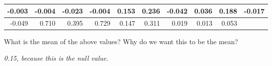 \begin{enumerate}
\begin{enumerate}
\begin{center}
\begin{tabular}{|r|r|r|r|r|r|r|r|r|r|} \hline
-0.003 &-0.004 &-0.023 &-0.004 &0.153 &0.236 &-0.042 &0.036 &0.188 &-0.017
\\ \hline
-0.049 &0.710 &0.395 &0.729 &0.147 &0.311 &0.019 &0.013 &0.053
& \\ \hline
\end{tabular}  
\end{center}
      What is the mean of the above values? Why do we want this
      to be the mean?
\begin{students}
  \vspace{1cm}
\end{students}

\begin{key}
  {\it 0.15, because this is the null value. }
\end{key}


  



\end{enumerate}
\end{enumerate}
